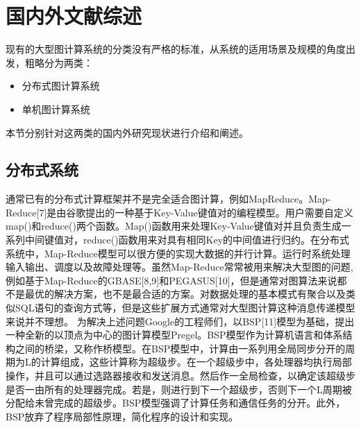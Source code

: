 \section{国内外文献综述}
现有的大型图计算系统的分类没有严格的标准，从系统的适用场景及规模的角度出发，粗略分为两类：
\begin{itemize}
\item 分布式图计算系统
\item 单机图计算系统
\end{itemize}
本节分别针对这两类的国内外研究现状进行介绍和阐述。

\subsection{分布式系统}
通常已有的分布式计算框架并不是完全适合图计算，例如MapReduce。Map-Reduce[7]是由谷歌提出的一种基于Key-Value键值对的编程模型。用户需要自定义map()和reduce()两个函数。Map()函数用来处理Key-Value键值对并且负责生成一系列中间键值对，reduce()函数用来对具有相同Key的中间值进行归约。在分布式系统中，Map-Reduce模型可以很方便的实现大数据的并行计算。运行时系统处理输入输出、调度以及故障处理等。虽然Map-Reduce常常被用来解决大型图的问题,例如基于Map-Reduce的GBASE[8,9]和PEGASUS[10]，但是通常对图算法来说都不是最优的解决方案，也不是最合适的方案。对数据处理的基本模式有聚合以及类似SQL语句的查询方式等，但是这些扩展方式通常对大型图计算这种消息传递模型来说并不理想。
为解决上述问题Google的工程师们，以BSP[11]模型为基础，提出一种全新的以顶点为中心的图计算模型Pregel。BSP模型作为计算机语言和体系结构之间的桥梁，又称作桥模型。在BSP模型中，计算由一系列用全局同步分开的周期为L的计算组成，这些计算称为超级步。在一个超级步中，各处理器均执行局部操作，并且可以通过选路器接收和发送消息。然后作一全局检查，以确定该超级步是否一由所有的处理器完成。若是，则进行到下一个超级步，否则下一个L周期被分配给未曾完成的超级步。BSP模型强调了计算任务和通信任务的分开。此外，BSP放弃了程序局部性原理，简化程序的设计和实现。

